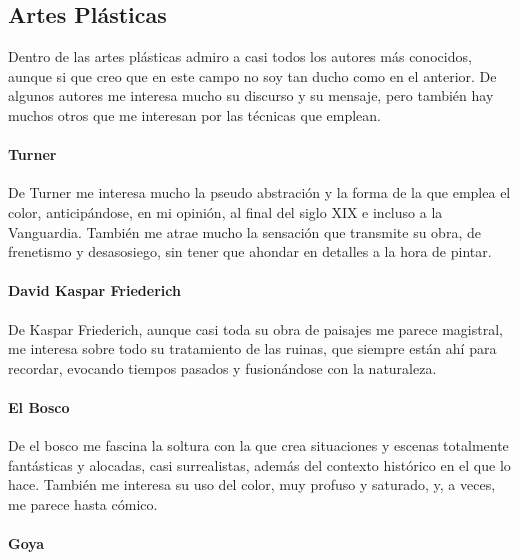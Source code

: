 \documentclass[twoside]{article}
\begin{document}
\begin{multicols}{2}
  \hypertarget{artes-pluxe1sticas}{%
  \subsection{Artes Plásticas}\label{artes-pluxe1sticas}}
  
  Dentro de las artes plásticas admiro a casi todos los autores más
  conocidos, aunque si que creo que en este campo no soy tan ducho como en
  el anterior. De algunos autores me interesa mucho su discurso y su
  mensaje, pero también hay muchos otros que me interesan por las técnicas
  que emplean.
  
  \hypertarget{turner}{%
  \paragraph{Turner}\label{turner}}
  
  De Turner me interesa mucho la pseudo abstración y la forma de la que
  emplea el color, anticipándose, en mi opinión, al final del siglo XIX e
  incluso a la Vanguardia. También me atrae mucho la sensación que
  transmite su obra, de frenetismo y desasosiego, sin tener que ahondar en
  detalles a la hora de pintar.
  
  \hypertarget{david-kaspar-friederich}{%
  \paragraph{David Kaspar Friederich}\label{david-kaspar-friederich}}
  
  De Kaspar Friederich, aunque casi toda su obra de paisajes me parece
  magistral, me interesa sobre todo su tratamiento de las ruinas, que
  siempre están ahí para recordar, evocando tiempos pasados y fusionándose
  con la naturaleza.
  
  \hypertarget{el-bosco}{%
    \paragraph{El Bosco}\label{el-bosco}}
    
    De el bosco me fascina la soltura con la que crea situaciones y escenas
    totalmente fantásticas y alocadas, casi surrealistas, además del
    contexto histórico en el que lo hace. También me interesa su uso del
    color, muy profuso y saturado, y, a veces, me parece hasta cómico.
    
    \hypertarget{goya}{%
    \paragraph{Goya}\label{goya}}
    

\end{multicols}
\end{document}
